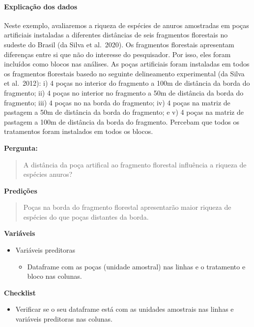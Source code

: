 \documentclass[
]{book}
\providecommand{\tightlist}{%
  \setlength{\itemsep}{0pt}\setlength{\parskip}{0pt}}
\begin{document}
\hypertarget{explicauxe7uxe3o-dos-dados-8}{%
\paragraph{Explicação dos dados}\label{explicauxe7uxe3o-dos-dados-8}}

Neste exemplo, avaliaremos a riqueza de espécies de anuros amostradas em poças artificiais instaladas a diferentes distâncias de seis fragmentos florestais no sudeste do Brasil (da Silva et al.~2020). Os fragmentos florestais apresentam diferenças entre si que não do interesse do pesquisador. Por isso, eles foram incluídos como blocos nas análises. As poças artificiais foram instaladas em todos os fragmentos florestais basedo no seguinte delineamento experimental (da Silva et al.~2012): i) 4 poças no interior do fragmento a 100m de distância da borda do fragmento; ii) 4 poças no interior no fragmento a 50m de distância da borda do fragmento; iii) 4 poças no na borda do fragmento; iv) 4 poças na matriz de pastagem a 50m de distância da borda do fragmento; e v) 4 poças na matriz de pastagem a 100m de distância da borda do fragmento. Percebam que todos os tratamentos foram instalados em todos os blocos.

\textbf{Pergunta:}

\begin{quote}
A distância da poça artifical ao fragmento florestal influência a riqueza de espécies anuros?
\end{quote}

\textbf{Predições}

\begin{quote}
Poças na borda do fragmento florestal apresentarão maior riqueza de espécies do que poças distantes da borda.
\end{quote}

\textbf{Variáveis}

\begin{itemize}
\tightlist
\item
  Variáveis preditoras

  \begin{itemize}
  \tightlist
  \item
    Dataframe com as poças (unidade amostral) nas linhas e o tratamento e bloco nas colunas.
  \end{itemize}
\end{itemize}

\textbf{Checklist}

\begin{itemize}
\tightlist
\item
  Verificar se o seu dataframe está com as unidades amostrais nas linhas e variáveis preditoras nas colunas.
\end{itemize}
\end{document}
